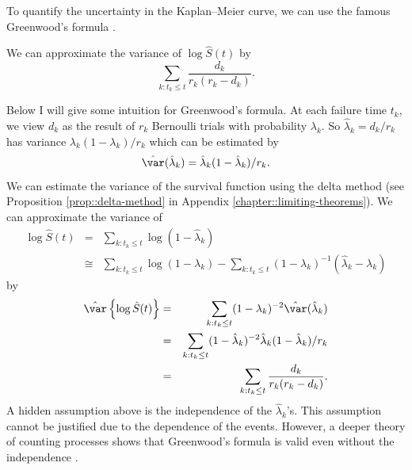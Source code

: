 To quantify the uncertainty in the Kaplan--Meier curve,  we can use the famous Greenwood's formula \citep{greenwood1926report}. 
\begin{definition}
\label{def::greenwood-formula}
We can approximate the variance of $\log\hat{S}(t) $ by 
$$
\sum_{k:t_{k}\leq t}\frac{d_{k}}{r_{k}(r_{k}-d_{k})}.
$$
\end{definition}

Below I will give some intuition for Greenwood's formula. 
At each failure time $t_{k}$, we view $d_{k}$ as the result of $r_{k}$
Bernoulli trials with probability $\lambda_{k}$. So $\hat{\lambda}_{k}=d_{k}/r_{k}$
has variance $\lambda_{k}(1-\lambda_{k})/r_{k}$ which can be estimated
by 
\[
\hat{\var}(\hat{\lambda}_{k})=\hat{\lambda}_{k}(1-\hat{\lambda}_{k})/r_{k}.
\]
We can estimate the variance of the survival function using the delta method (see Proposition \ref{prop::delta-method} in Appendix \ref{chapter::limiting-theorems}). We can approximate the variance of
\begin{eqnarray*}
\log\hat{S}(t) 
&=& \sum_{k:t_{k}\leq t}\log(1-\hat{\lambda}_{k}) \\ 
&\cong & \sum_{k:t_{k}\leq t}\log(1-\lambda_{k})-\sum_{k:t_{k}\leq t}(1-\lambda_{k})^{-1}(\hat{\lambda}_{k}-\lambda_{k})
\end{eqnarray*}
by
\begin{eqnarray*}
\hat{\var}\left\{ \log\hat{S}(t)\right\}  &=&\sum_{k:t_{k}\leq t}(1-\lambda_{k})^{-2}\hat{\var}(\hat{\lambda}_{k}) \\
&=&\sum_{k:t_{k}\leq t}(1-\hat{\lambda}_{k})^{-2}\hat{\lambda}_{k}(1-\hat{\lambda}_{k})/r_{k}\\
&=&\sum_{k:t_{k}\leq t}\frac{d_{k}}{r_{k}(r_{k}-d_{k})} .
\end{eqnarray*}
A hidden assumption above is the independence of the $\hat{\lambda}_k$'s. This assumption cannot be justified due to the dependence of the events. However, a deeper theory of counting processes shows that  Greenwood's formula is valid even without the independence \citep{fleming2011counting}. 


